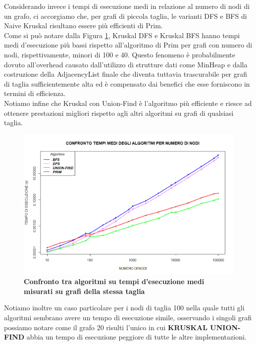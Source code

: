 \documentclass[]{article}
\begin{document}
\begin{flushleft}
\newpage
Considerando invece i tempi di esecuzione medi in relazione al numero di nodi di un grafo, ci accorgiamo che, per grafi di piccola taglia, le varianti DFS e BFS di Naive Kruskal risultano essere più efficienti di Prim.\\
Come si può notare dalla Figura \ref{conf_tot}, Kruskal DFS e Kruskal BFS hanno tempi medi d'esecuzione più bassi rispetto all'algoritmo di Prim per grafi con numero di nodi, rispettivamente, minori di 100 e 40.
Questo fenomeno è probabilmente dovuto all'overhead causato dall'utilizzo di strutture dati come MinHeap e dalla costruzione della AdjacencyList finale che diventa tuttavia trascurabile per grafi di taglia sufficientemente alta ed è compensato dai benefici che esse forniscono in termini di efficienza.\\
Notiamo infine che Kruskal con Union-Find è l'algoritmo più efficiente e riesce ad ottenere prestazioni migliori rispetto agli altri algoritmi su grafi di qualsiasi taglia.
\begin{figure}[h]
	\centering
	\includegraphics[width=\textwidth,height=\textheight,keepaspectratio]{CONFRONTO_TOTALE.png}
	\caption{\textbf{Confronto tra algoritmi su tempi d'esecuzione medi misurati su grafi della stessa taglia}}
	\label{conf_tot}
\end{figure}
Notiamo inoltre un caso particolare per i nodi di taglia 100 nella quale tutti gli algoritmi sembrano avere un tempo di esecuzione simile, osservando i singoli grafi possiamo notare come il grafo 20 risulti l'unico in cui \textbf{KRUSKAL UNION-FIND} abbia un tempo di esecuzione peggiore di tutte le altre implementazioni.



\end{flushleft}
\end{document}
